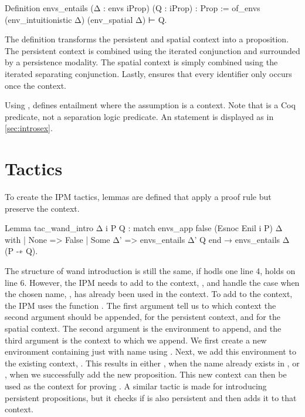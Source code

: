 \documentclass[thesis.tex]{subfiles}
\begin{document}
{\begin{coqcode}
  Definition envs_entails 
      (Δ : envs iProp) (Q : iProp) : Prop :=
    of_envs (env_intuitionistic Δ) (env_spatial Δ) ⊢ Q.
\end{coqcode}
The definition  transforms the persistent and spatial context into a proposition. The persistent context is combined using the iterated conjunction and surrounded by a persistence modality. The spatial context is simply combined using the iterated separating conjunction. Lastly,  ensures that every identifier only occurs once the context.

Using ,  defines entailment where the assumption is a context. Note that  is a Coq predicate, not a separation logic predicate. An  statement is displayed as in \cref{sec:introsex}.

\section{Tactics}\label{sec:iristactics}
To create the IPM tactics, lemmas are defined that apply a proof rule but preserve the context.
\begin{coqcode}
  Lemma tac_wand_intro Δ i P Q :
    match envs_app false (Esnoc Enil i P) Δ with
    | None => False
    | Some Δ' => envs_entails Δ' Q
    end →
    envs_entails Δ (P -∗ Q).
\end{coqcode}
The structure of wand introduction is still the same, if  hodls one line 4,  holds on line 6. However, the IPM needs to add  to the context, , and handle the case when the chosen name, , has already been used in the context. To add  to the context, the IPM uses the function . The first argument tell us to which context the second argument should be appended,  for the persistent context, and  for the spatial context. The second argument is the environment to append, and the third argument is the context to which we append. We first create a new environment containing just  with name  using . Next, we add this environment to the existing context, . This results in either , when the name already exists in , or , when we successfully add the new proposition. This new context can then be used as the context for proving . A similar tactic is made for introducing persistent propositions, but it checks if  is also persistent and then adds it to that context.

}
\end{document}
